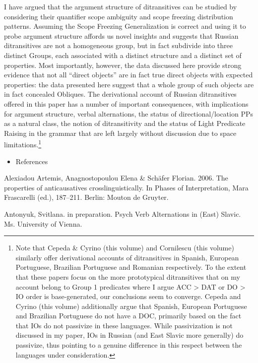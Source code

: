 \documentclass[output=paper,modfonts, nonflat]{langsci/langscibook}
\begin{document}
I have argued that the argument structure of ditransitives can be studied by considering their quantifier scope ambiguity and scope freezing distribution patterns. Assuming the Scope Freezing Generalization is correct and using it to probe argument structure affords us novel insights and suggests that Russian ditransitives are not a homogeneous group, but in fact subdivide into three distinct Groups, each associated with a distinct structure and a distinct set of properties. Most importantly, however, the data discussed here provide strong evidence that not all “direct objects” are in fact true direct objects with expected properties: the data presented here suggest that a whole group of such objects are in fact concealed Obliques. The derivational account of Russian ditransitives offered in this paper has a number of important consequences, with implications for argument structure, verbal alternations, the status of directional/location PPs as a natural class, the notion of ditransitivity and the status of Light Predicate Raising in the grammar that are left largely without discussion due to space limitations.\footnote{Note that Cepeda \& Cyrino (this volume) and Cornilescu (this volume) similarly offer derivational accounts of ditransitives in Spanish, European Portuguese, Brazilian Portuguese and Romanian respectively. To the extent that these papers focus on the more prototypical ditransitives that on my account belong to Group 1 predicates where I argue ACC > DAT or DO > IO order is base-generated, our conclusions seem to converge. Cepeda and Cyrino (this volume) additionally argue that Spanish, European Portuguese and Brazilian Portuguese do not have a DOC, primarily based on the fact that IOs do not passivize in these languages. While passivization is not discussed in my paper, IOs in Russian (and East Slavic more generally) do passivize, thus pointing to a genuine difference in this respect between the languages under consideration.} 

\begin{itemize}
\item References
\end{itemize}

Alexiadou Artemis, Anagnostopoulou Elena \& Schäfer Florian. 2006. The properties of anticausatives crosslinguistically. In Phases of Interpretation, Mara Frascarelli (ed.), 187–211. Berlin: Mouton de Gruyter.

Antonyuk, Svitlana. in preparation. Psych Verb Alternations in (East) Slavic. Ms. University of Vienna.
\end{document}
